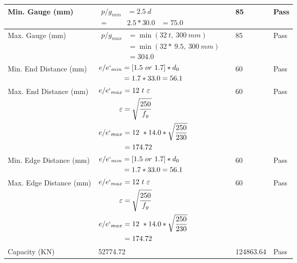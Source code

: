 \documentclass{article}%
\begin{document}
\begin{longtable}{|p{4cm}|p{5cm}|p{5.5cm}|p{1.5cm}|}
\hline%
Min. Gauge (mm)&$\begin{aligned}p/g_{min}&= 2.5 ~ d&\\ =&2.5*30.0&=75.0\end{aligned}$&85&Pass\\%
\hline%
Max. Gauge (mm)&$\begin{aligned}p/g_{max} &=\min(32~t,~300~mm)&\\ &=\min(32 *~9.5,~ 300 ~mm)\\&=304.0\end{aligned}$&85&Pass\\%
\hline%
Min. End Distance (mm)&$\begin{aligned}e/e`_{min} &=[1.5~or~ 1.7] * d_0\\ &=1.7*33.0=56.1 \end{aligned}$&60&Pass\\%
\hline%
Max. End Distance (mm)&$\begin{aligned}e/e`_{max} &= 12~ t~ \varepsilon&\\ \varepsilon &= \sqrt{\frac{250}{f_y}}\\ e/e`_{max}&=12 ~*14.0*\sqrt{\frac{250}{230}}\\ &=174.72\\ \end{aligned}$&60&Pass\\%
\hline%
Min. Edge Distance (mm)&$\begin{aligned}e/e`_{min} &=[1.5~or~ 1.7] * d_0\\ &=1.7*33.0=56.1 \end{aligned}$&60&Pass\\%
\hline%
Max. Edge Distance (mm)&$\begin{aligned}e/e`_{max} &= 12~ t~ \varepsilon&\\ \varepsilon &= \sqrt{\frac{250}{f_y}}\\ e/e`_{max}&=12 ~*14.0*\sqrt{\frac{250}{230}}\\ &=174.72\\ \end{aligned}$&60&Pass\\%
\hline%
Capacity (KN)&52774.72&124863.64&Pass\\%
\hline%
\end{longtable}

%
\end{document}
